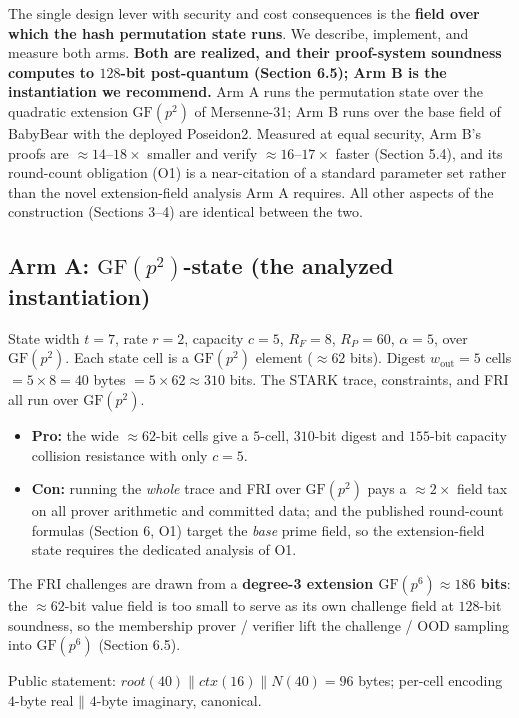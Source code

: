 \documentclass[11pt]{article}
\newcommand{\GF}[1]{\mathrm{GF}(#1)}
\newcommand{\cat}{\mathbin{\|}}          %
\newcommand{\wout}{w_{\mathrm{out}}}
\theoremstyle{plain}
\theoremstyle{definition}
\begin{document}
The single design lever with security and cost consequences is the \textbf{field over which the hash
permutation state runs}. We describe, implement, and measure both arms. \textbf{Both are realized,
and their proof-system soundness computes to $128$-bit post-quantum (Section 6.5); Arm B is the
instantiation we recommend.} Arm A runs the permutation state over the quadratic extension
$\GF{p^2}$ of Mersenne-31; Arm B runs over the base field of BabyBear with the deployed Poseidon2.
Measured at equal security, Arm B's proofs are $\approx 14$--$18\times$ smaller and verify
$\approx 16$--$17\times$ faster (Section 5.4), and its round-count obligation (O1) is a near-citation
of a standard parameter set rather than the novel extension-field analysis Arm A requires. All other
aspects of the construction (Sections 3--4) are identical between the two.

\subsection{Arm A: \texorpdfstring{$\GF{p^2}$}{GF(p2)}-state (the analyzed instantiation)}

State width $t = 7$, rate $r = 2$, capacity $c = 5$, $R_F = 8$, $R_P = 60$, $\alpha = 5$, over
$\GF{p^2}$. Each state cell is a $\GF{p^2}$ element ($\approx 62$ bits). Digest $\wout = 5$ cells
$= 5 \times 8 = 40$ bytes $= 5 \times 62 \approx 310$ bits. The STARK trace, constraints, and FRI all
run over $\GF{p^2}$.
\begin{itemize}[leftmargin=*]
\item \textbf{Pro:} the wide $\approx 62$-bit cells give a $5$-cell, $310$-bit digest and $155$-bit
  capacity collision resistance with only $c = 5$.
\item \textbf{Con:} running the \emph{whole} trace and FRI over $\GF{p^2}$ pays a $\approx 2\times$
  field tax on all prover arithmetic and committed data; and the published round-count formulas
  (Section 6, O1) target the \emph{base} prime field, so the extension-field state requires the
  dedicated analysis of O1.
\end{itemize}
The FRI challenges are drawn from a \textbf{degree-3 extension $\GF{p^6} \approx 186$ bits}: the
$\approx 62$-bit value field is too small to serve as its own challenge field at $128$-bit soundness,
so the membership prover / verifier lift the challenge / OOD sampling into $\GF{p^6}$ (Section 6.5).

Public statement: $\mathit{root}(40) \cat \mathit{ctx}(16) \cat N(40) = 96$ bytes; per-cell encoding
$4$-byte real $\cat$ $4$-byte imaginary, canonical.
\end{document}
